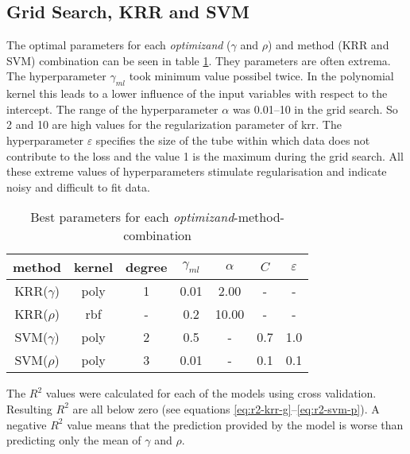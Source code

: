 %


\subsection{Grid Search, KRR and SVM}
The optimal parameters for each \textit{optimizand} ($\gamma$ and $\rho$) and method (KRR and SVM) 
combination can be seen in table \ref{tab:grid-search}. 
They parameters are often extrema.
The hyperparameter $\gamma_{ml}$ took minimum value possibel twice. 
In the polynomial kernel this leads to a lower influence of the input variables with respect to the intercept. 
The range of the hyperparameter $\alpha$ was 0.01--10 in the grid search. 
So 2 and 10 are high values for the regularization parameter of \gls{krr}.
The hyperparameter $\varepsilon$ specifies the size of the tube within which data does not contribute to the loss 
and the value 1 is the maximum during the grid search. 
All these extreme values of hyperparameters stimulate regularisation and indicate noisy and difficult to fit data.
\begin{table}
    \center
    \begin{tabular}{ccccccc}
        \hline\hline
        method  &kernel &degree &$\gamma_{ml}$   &$\alpha$    &$C$    &$\varepsilon$\\
        \hline
        KRR($\gamma$)   &poly   &1  &0.01   &2.00 &-&-\\
        KRR($\rho  $)   &rbf    &-   &0.2    &10.00&-&-\\
        SVM($\gamma$)   &poly   &2  &0.5    &-&0.7  &1.0  \\
        SVM($\rho  $)   &poly   &3  &0.01   &-&0.1  &0.1  \\
        \hline\hline
    \end{tabular}
    \caption{Best parameters for each \textit{optimizand}-method-combination}
    \label{tab:grid-search}
\end{table}
The $R^2$ values were calculated for each of the models using cross validation. 
Resulting $R^2$ are all below zero (see equations \ref{eq:r2-krr-g}--\ref{eq:r2-svm-p}). 
A negative $R^2$ value means that the prediction provided by the model is worse than predicting only the mean of $\gamma$ and $\rho$. 

